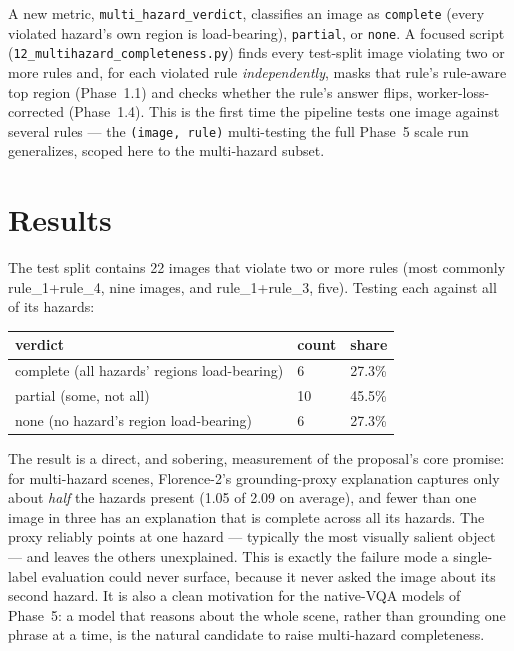 A new metric, \texttt{multi\_hazard\_verdict}, classifies an image as \texttt{complete} (every violated
hazard's own region is load-bearing), \texttt{partial}, or \texttt{none}. A focused script
(\texttt{12\_multihazard\_completeness.py}) finds every test-split image violating two or more rules and,
for each violated rule \emph{independently}, masks that rule's rule-aware top region (Phase~1.1) and
checks whether the rule's answer flips, worker-loss-corrected (Phase~1.4). This is the first time the
pipeline tests one image against several rules --- the \texttt{(image, rule)} multi-testing the full
Phase~5 scale run generalizes, scoped here to the multi-hazard subset.

\section{Results}

The test split contains 22 images that violate two or more rules (most commonly rule\_1+rule\_4, nine
images, and rule\_1+rule\_3, five). Testing each against all of its hazards:

\begin{center}
\begin{tabular}{p{4.6cm}p{2.4cm}p{2.4cm}}
\toprule
\textbf{verdict} & \textbf{count} & \textbf{share} \\
\midrule
complete (all hazards' regions load-bearing) & 6 & 27.3\% \\
partial (some, not all)                      & 10 & 45.5\% \\
none (no hazard's region load-bearing)       & 6 & 27.3\% \\
\bottomrule
\end{tabular}
\label{tab:p25-multihazard}
\end{center}

The result is a direct, and sobering, measurement of the proposal's core promise: for multi-hazard
scenes, Florence-2's grounding-proxy explanation captures only about \emph{half} the hazards present
(1.05 of 2.09 on average), and fewer than one image in three has an explanation that is complete across
all its hazards. The proxy reliably points at one hazard --- typically the most visually salient object
--- and leaves the others unexplained. This is exactly the failure mode a single-label evaluation could
never surface, because it never asked the image about its second hazard. It is also a clean motivation
for the native-VQA models of Phase~5: a model that reasons about the whole scene, rather than grounding
one phrase at a time, is the natural candidate to raise multi-hazard completeness.

